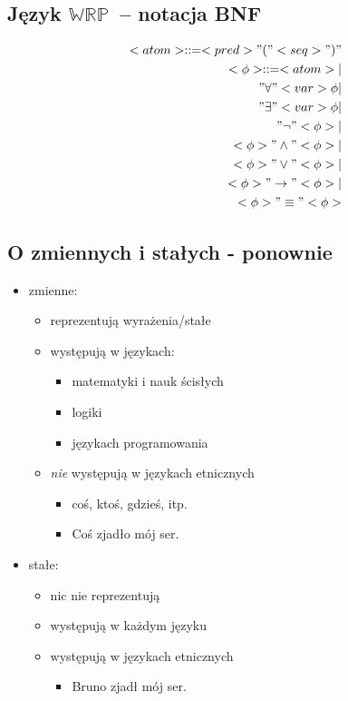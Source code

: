 \documentclass[12pt]{article}
\newcommand {\WRP} {\ensuremath{\mathbb{WRP}}}
\begin{document}
\subsection{Język \WRP\ -- notacja BNF}
%
\begin{eqnarray}
<atom> ::= <pred>"("<seq>")" \\
%
<\phi> ::= <atom> | \nonumber  \\ 
"\forall"<var> \phi | \nonumber  \\
"\exists"<var> \phi | \nonumber  \\
"\neg" <\phi> | \nonumber  \\
<\phi> "\land" <\phi> | \nonumber \\
<\phi> "\lor" <\phi> | \nonumber  \\
<\phi> "\to" <\phi> | \nonumber  \\
<\phi> "\equiv" <\phi>
\end{eqnarray}
%

\subsection{O zmiennych i stałych - ponownie}
%
\begin{itemize}
\item zmienne:
\begin{itemize}
\item reprezentują wyrażenia/stałe
\item występują w językach:
\begin{itemize}
\item matematyki i nauk ścisłych
\item logiki
\item językach programowania
\end{itemize}
\item \emph{nie} występują w językach etnicznych
\begin{itemize}
\item coś, ktoś, gdzieś, itp.
\item Coś zjadło mój ser.
\end{itemize}
\end{itemize}
%
\item stałe:
\begin{itemize}
\item nic nie reprezentują
\item występują w każdym języku
\item występują w językach etnicznych
\begin{itemize}
\item Bruno zjadł mój ser.
\end{itemize}
\end{itemize}
\end{itemize}
%
\end{document}
